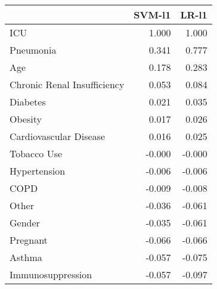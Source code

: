 \begin{tabular}{lrr}
\toprule
{} &  SVM-l1 &  LR-l1 \\
\midrule
ICU                         &   1.000 &  1.000 \\
Pneumonia                   &   0.341 &  0.777 \\
Age                         &   0.178 &  0.283 \\
Chronic Renal Insufficiency &   0.053 &  0.084 \\
Diabetes                    &   0.021 &  0.035 \\
Obesity                     &   0.017 &  0.026 \\
Cardiovascular Disease      &   0.016 &  0.025 \\
Tobacco Use                 &  -0.000 & -0.000 \\
Hypertension                &  -0.006 & -0.006 \\
COPD                        &  -0.009 & -0.008 \\
Other                       &  -0.036 & -0.061 \\
Gender                      &  -0.035 & -0.061 \\
Pregnant                    &  -0.066 & -0.066 \\
Asthma                      &  -0.057 & -0.075 \\
Immunosuppression           &  -0.057 & -0.097 \\
\bottomrule
\end{tabular}
